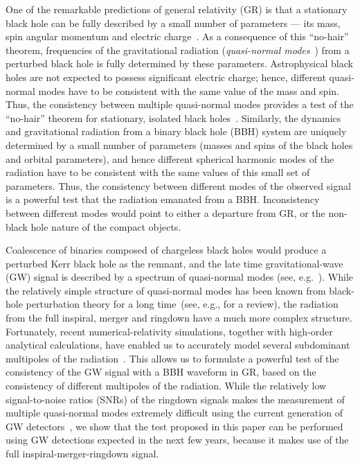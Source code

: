 \documentclass[prl,preprintnumbers,twocolumn,eqsecnum,floatfix,a4paper,nofootinbib,superscriptaddress]{revtex4}
\begin{document}
One of the remarkable predictions of general relativity (GR) is that a stationary black hole can be fully described by a small number of parameters --- its mass, spin angular momentum and electric charge~\cite{Israel:1967,Israel:1968,Carter:1978}. As a consequence of this ``no-hair'' theorem, frequencies of the gravitational radiation (\emph{quasi-normal modes}~\cite{Vishveshwara:1970zz,Press:1971wr,Chandrasekhar:1975zza}) from a perturbed black hole is fully determined by these parameters. Astrophysical black holes are not expected to possess significant electric charge; hence, different quasi-normal modes have to be consistent with the same value of the mass and spin. Thus, the consistency between multiple quasi-normal modes provides a test of the ``no-hair'' theorem for stationary, isolated black holes~\cite{Dreyer:2003bv}. Similarly, the dynamics and gravitational radiation from a binary black hole (BBH) system are uniquely determined by a small number of parameters (masses and spins of the black holes and orbital parameters), and hence different spherical harmonic modes of the radiation have to be consistent with the same values of this small set of parameters. Thus, the consistency between different modes of the observed signal is a powerful test that the radiation emanated from a BBH. Inconsistency between different modes would point to either a departure from GR, or the non-black hole nature of the compact objects. 

Coalescence of binaries composed of chargeless black holes would produce a perturbed Kerr black hole as the remnant, and the late time gravitational-wave (GW) signal is described by a spectrum of quasi-normal modes (see, e.g.~\cite{Buonanno:2006ui}). While the relatively simple structure of quasi-normal modes has been known from black-hole perturbation theory for a long time~(see, e.g., \cite{Berti:2009kk} for a review), the radiation from the full inspiral, merger and ringdown have a much more complex structure. Fortunately, recent numerical-relativity simulations, together with high-order analytical calculations, have enabled us to accurately model several subdominant multipoles of the radiation~\cite{Pan:2011gk,London:2017bcn,Mehta:2017jpq}. This allows us to formulate a powerful test of the consistency of the GW signal with a BBH waveform in GR, based on the consistency of different multipoles of the radiation. While the relatively low signal-to-noise ratios (SNRs) of the ringdown signals makes the measurement of multiple quasi-normal modes extremely difficult using the current generation of GW detectors~\cite{Berti:2016lat}, we show that the test proposed in this paper can be performed using GW detections expected in the next few years, because it makes use of the full inspiral-merger-ringdown signal. 
\end{document}
